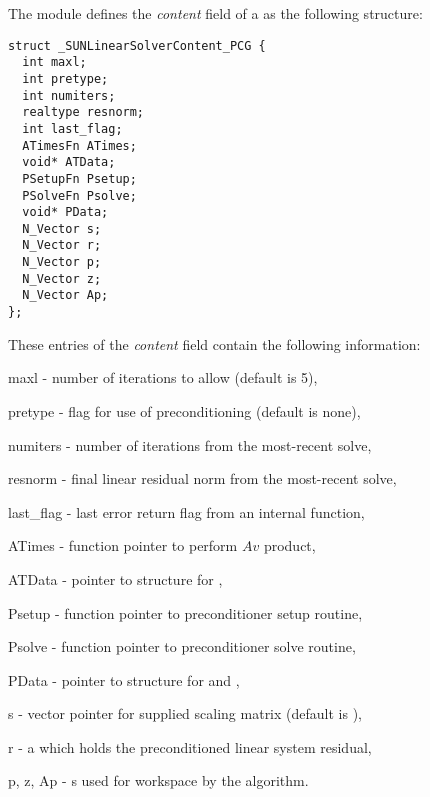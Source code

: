 The {\sunlinsolpcg} module defines the \textit{content} field of a
 as the following structure:
\begin{verbatim}
struct _SUNLinearSolverContent_PCG {
  int maxl;
  int pretype;
  int numiters;
  realtype resnorm;
  int last_flag;
  ATimesFn ATimes;
  void* ATData;
  PSetupFn Psetup;
  PSolveFn Psolve;
  void* PData;
  N_Vector s;
  N_Vector r;
  N_Vector p;
  N_Vector z;
  N_Vector Ap;
};
\end{verbatim}
These entries of the \emph{content} field contain the following
information:
\begin{args}
  \item[maxl] - number of {\pcg} iterations to allow (default is 5),
  \item[pretype] - flag for use of preconditioning (default is none),
  \item[numiters] - number of iterations from the most-recent solve,
  \item[resnorm] - final linear residual norm from the most-recent solve,
  \item[last\_flag] - last error return flag from an internal function,
  \item[ATimes] - function pointer to perform $Av$ product,
  \item[ATData] - pointer to structure for ,
  \item[Psetup] - function pointer to preconditioner setup routine,
  \item[Psolve] - function pointer to preconditioner solve routine,
  \item[PData] - pointer to structure for  and ,
  \item[s] - vector pointer for supplied scaling matrix
    (default is ),
  \item[r] - a {\nvector} which holds the preconditioned linear system
    residual,
  \item[p, z, Ap] - {\nvector}s used for workspace by the
    {\pcg} algorithm.
\end{args}
